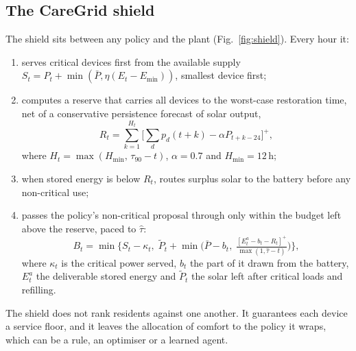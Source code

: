 \documentclass[conference]{IEEEtran}
\begin{document}
\subsection{The CareGrid shield}
The shield sits between any policy and the plant (Fig.~\ref{fig:shield}). Every hour it:
\begin{enumerate}
\item serves critical devices first from the available supply $S_t = P_t + \min(\bar P, \eta(E_t - E_{\min}))$, smallest device first;
\item computes a reserve that carries all devices to the worst-case restoration time, net of a conservative persistence forecast of solar output,
\begin{equation}
R_t = \sum_{k=1}^{H_t}\Big[\textstyle\sum_{d} p_d(t+k) - \alpha P_{t+k-24}\Big]^+,
\end{equation}
where $H_t=\max(H_{\min},\,\tau_{90}-t)$, $\alpha=0.7$ and $H_{\min}=12$\,h;
\item when stored energy is below $R_t$, routes surplus solar to the battery before any non-critical use;
\item passes the policy's non-critical proposal through only within the budget left above the reserve, paced to $\hat\tau$:
\begin{equation}
B_t=\min\!\Big\{S_t-\kappa_t,\;\tilde P_t+\min\!\big(\bar P-b_t,\;\tfrac{[E^{a}_t-b_t-R_t]^+}{\max(1,\hat\tau-t)}\big)\Big\},
\end{equation}
where $\kappa_t$ is the critical power served, $b_t$ the part of it drawn from the battery, $E^{a}_t$ the deliverable stored energy and $\tilde P_t$ the solar left after critical loads and refilling.
\end{enumerate}
The shield does not rank residents against one another. It guarantees each device a service floor, and it leaves the allocation of comfort to the policy it wraps, which can be a rule, an optimiser or a learned agent.
\end{document}
